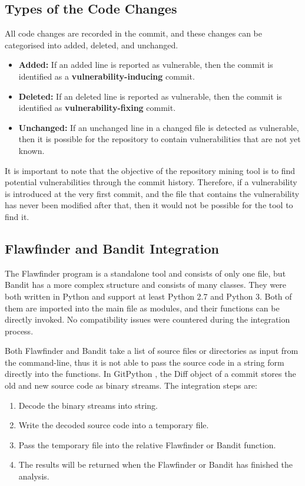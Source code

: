 \documentclass[12pt, a4paper]{report}
\begin{document}
\subsection{Types of the Code Changes} \label{sec:code_change_type}
All code changes are recorded in the commit, and these changes can be categorised into added,
deleted, and unchanged.
\begin{itemize}
  \item \textbf{Added:} If an added line is reported as vulnerable, then the commit is identified as
  a \textbf{vulnerability-inducing} commit.
  \item \textbf{Deleted:} If an deleted line is reported as vulnerable, then the commit is
  identified as \textbf{vulnerability-fixing} commit.
  \item \textbf{Unchanged:} If an unchanged line in a changed file is detected as vulnerable, then
  it is possible for the repository to contain vulnerabilities that are not yet known.
\end{itemize}

It is important to note that the objective of the repository mining tool is to find potential
vulnerabilities through the commit history. Therefore, if a vulnerability is introduced at the very
first commit, and the file that contains the vulnerability has never been modified after that, then
it would not be possible for the tool to find it.

\subsection{Flawfinder and Bandit Integration} \label{subsec:flawfinder_bandit}
The Flawfinder program is a standalone tool and consists of only one file, but Bandit has a more
complex structure and consists of many classes. They were both written in Python and support at
least Python 2.7 and Python 3. Both of them are imported into the main file as modules, and their
functions can be directly invoked. No compatibility issues were countered during the integration
process.

Both Flawfinder and Bandit take a list of source files or directories as input from the
command-line, thus it is not able to pass the source code in a string form directly into the
functions. In GitPython \cite{gitpython}, the Diff object of a commit stores the old and new source
code as binary streams. The integration steps are:
\begin{enumerate}
  \item Decode the binary streams into string.
  \item Write the decoded source code into a temporary file.
  \item Pass the temporary file into the relative Flawfinder or Bandit function.
  \item The results will be returned when the Flawfinder or Bandit has finished the analysis.
\end{enumerate}
\end{document}
